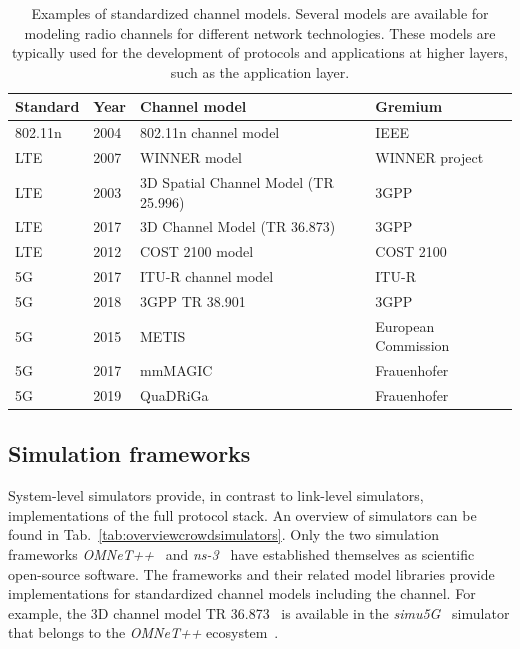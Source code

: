 \begin{table}[hbt!]
\begin{footnotesize}
\begin{tabular}{p{2.0cm}p{1.2cm}p{6.5cm}p{3.2cm}}
\hline 
{Standard} & {Year} & {Channel model} & {Gremium} \\
\hline
802.11n & 2004 & 802.11n channel model \cite{erceg-2004-com} & IEEE \\
LTE & 2007 & WINNER model \cite{winner-2007-com} & WINNER project \\
LTE & 2003 & 3D Spatial Channel Model (TR 25.996) \cite{3gpp2-2003-com} & 3GPP \\
LTE & 2017 & 3D Channel Model (TR 36.873) \cite{3gpptr36873-2017-com} & 3GPP \\
LTE & 2012 & COST 2100 model \cite{liu-2012-com} & COST 2100 \\
5G & 2017 & ITU-R channel model \cite{itu-2017-com} & ITU-R \\
5G & 2018 & 3GPP TR 38.901 \cite{tr38901-2018-com} & 3GPP \\
5G & 2015 & METIS \cite{raschkowski-2015-com} & European Commission \\
5G & 2017 & mmMAGIC \cite{peter-2017-com} & Frauenhofer \\
5G & 2019 & QuaDRiGa \cite{jaeckel-2019-com} & Frauenhofer \\
\hline 
\end{tabular} 
\end{footnotesize}
\caption{Examples of standardized channel models. Several models are available for modeling radio channels for different network technologies.  These models are typically used for the development of protocols and applications at higher layers, such as the application layer. }
\label{tab:standardchannelmodels}
\end{table}



\subsection{Simulation frameworks}
\label{sec:mobilenetworkssimulationframeworks}

System-level simulators provide, in contrast to link-level simulators, implementations of the full protocol stack. An overview of simulators can be found in Tab.~\ref{tab:overviewcrowdsimulators}.
Only the two simulation frameworks \textit{OMNeT++}~\cite{varga-2019-com} and \textit{ns-3}~\cite{riley-2010-com} have established themselves as scientific open-source software. The frameworks and their related model libraries provide implementations for standardized channel models including the channel. For example, the 3D channel model TR 36.873~\cite{3gpptr36873-2017-com} is available in the \textit{simu5G}~\cite{3gpptr36873-2017-com} simulator that belongs to the \textit{OMNeT++} ecosystem~\cite{nardini-2020b-com}.



